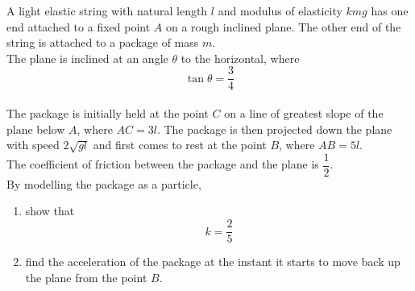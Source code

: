 \documentclass[leqno]{article}
\begin{document}
\begin{enumerate}[
  label=\textbf{\arabic*.},
  leftmargin=*,
  topsep=0pt,
  partopsep=0pt,
  parsep=0pt
]
\newpage

\questionitem

A light elastic string with natural length $l$ and modulus of elasticity $kmg$ has one end attached to a fixed point $A$ on a rough inclined plane. The other end of the string is attached to a package of mass $m$. \\
The plane is inclined at an angle $\theta$ to the horizontal, where
\[
\tan \theta = \dfrac{3}{4}
\] \\
The package is initially held at the point $C$ on a line of greatest slope of the plane below $A$, where $AC = 3l$. The package is then projected down the plane with speed $2\sqrt{gl}$ and first comes to rest at the point $B$, where $AB = 5l$. \\
The coefficient of friction between the package and the plane is $\dfrac{1}{2}$. \\
By modelling the package as a particle, \\
\begin{enumerate}[label=\textbf{(\alph*)}]
  \item show that
  \[
  k = \dfrac{2}{5}
  \]
  \item find the acceleration of the package at the instant it starts to move back up the plane from the point $B$.  \\
\end{enumerate}

\newpage


\questionitem

\begin{figure}[H]
    \centering
{}
\end{figure}
\end{enumerate}
\end{document}
